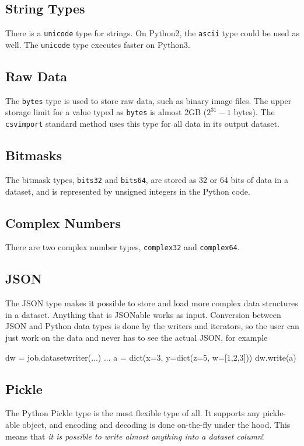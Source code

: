 \subsection{String Types}
There is a \texttt{unicode} type for strings.  On Python2, the
\texttt{ascii} type could be used as well.  The \texttt{unicode}
type executes faster on Python3.


\subsection{Raw Data}

The \texttt{bytes} type is used to store raw data, such as binary
image files.  The upper storage limit for a value typed
as \texttt{bytes} is almost 2GB ($2^{31}-1$ bytes).
The \texttt{csvimport} standard method uses this type for all data in
its output dataset.


\subsection{Bitmasks}
The bitmask types, \texttt{bits32} and \texttt{bits64}, are stored as
32 or 64 bits of data in a dataset, and is represented by unsigned
integers in the Python code.


\subsection{Complex Numbers}
There are two complex number types, \texttt{complex32}
and \texttt{complex64}.


\subsection{JSON}
The JSON type makes it possible to store and load more complex data
structures in a dataset.  Anything that is JSONable works as input.
Conversion between JSON and Python data types is done by the writers
and iterators, so the user can just work on the data and never has to
see the actual JSON, for example
\begin{python}
    dw = job.datasetwriter(...)
    ...
    a = dict(x=3, y=dict(z=5, w=[1,2,3]))
    dw.write(a)
\end{python}



\subsection{Pickle}
The Python Pickle type is the most flexible type of all.  It supports
any pickle-able object, and encoding and decoding is done on-the-fly
under the hood.  This means that \textsl{it is possible to write almost
anything into a dataset column}!



